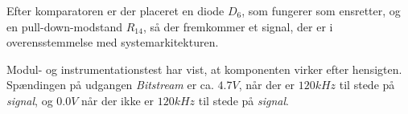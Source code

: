 Efter komparatoren er der placeret en diode $D_{6}$\cite{lib:1N4148}, som fungerer som ensretter, og en pull-down-modstand $R_{14}$, så der fremkommer et signal, der er i overensstemmelse med systemarkitekturen.

Modul- og instrumentationstest har vist, at komponenten virker efter hensigten. Spændingen på udgangen \textit{Bitstream} er ca. $4.7V$, når der er $120kHz$ til stede på \textit{signal}, og $0.0V$ når der ikke er $120kHz$ til stede på \textit{signal}.